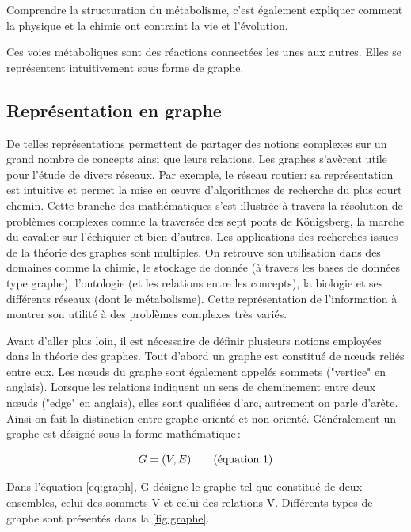 \begin{refsegment}
    Comprendre la structuration du métabolisme, c'est également expliquer comment la physique et la chimie ont contraint la vie et l'évolution.
    
    Ces voies métaboliques sont des réactions connectées les unes aux autres. Elles se représentent intuitivement sous forme de graphe.
    
    \subsection{Représentation en graphe}
    
    De telles représentations permettent de partager des notions complexes sur un grand nombre de concepts ainsi que leurs relations. Les graphes s'avèrent utile pour l'étude de divers réseaux. Par exemple, le réseau routier: sa représentation est intuitive et permet la mise en œuvre d'algorithmes de recherche du plus court chemin. Cette branche des mathématiques s'est illustrée à travers la résolution de problèmes complexes comme la traversée des sept ponts de Königsberg, la marche du cavalier sur l’échiquier et bien d'autres. Les applications des recherches issues de la théorie des graphes sont multiples. On retrouve son utilisation dans des domaines comme la chimie, le stockage de donnée (à travers les bases de données type graphe), l'ontologie (et les relations entre les concepts), la biologie et ses différents réseaux (dont le métabolisme). Cette représentation de l'information à montrer son utilité à des problèmes complexes très variés.
    
    Avant d'aller plus loin, il est nécessaire de définir plusieurs notions employées dans la théorie des graphes. Tout d'abord un graphe est constitué de nœuds reliés entre eux. Les nœuds du graphe sont également appelés sommets ("vertice" en anglais).  Lorsque les relations indiquent un sens de cheminement entre deux nœuds ("edge" en anglais), elles sont qualifiées d'arc, autrement on parle d'arête. Ainsi on fait la distinction entre graphe orienté et non-orienté. Généralement un graphe est désigné sous la forme mathématique :
    
    \begin{equation}\label{eq:graph}
    	G = (V,E) \stepcounter{equation}\tag{équation \theequation}
    \end{equation}
    
    Dans l'équation \ref{eq:graph}, G désigne le graphe tel que constitué de deux ensembles, celui des sommets V et celui des relations V. Différents types de graphe sont présentés dans la \cref{fig:graphe}.
    

\end{refsegment}
